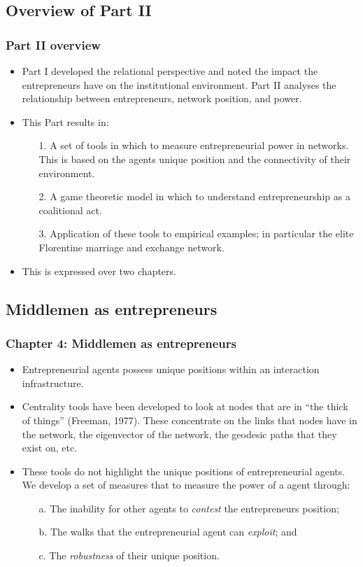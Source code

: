 \documentclass[10pt]{beamer}
\begin{document}
\subsection{Overview of Part II}

\begin{frame} \frametitle{Part II overview}
\begin{itemize}
\item Part I developed the relational perspective and noted the impact the entrepreneurs have on the institutional environment. Part II analyses the relationship between entrepreneurs, network position, and power.
\medskip
\item This Part results in:
\begin{itemize}
\medskip
\item[1.] A set of tools in which to measure entrepreneurial power in networks. This is based on the agents unique position and the connectivity of their environment.
\medskip
\item[2.] A game theoretic model in which to understand entrepreneurship as a coalitional act.
\medskip
\item[3.] Application of these tools to empirical examples; in particular the elite Florentine marriage and exchange network.
\end{itemize}
\medskip
\item This is expressed over two chapters.
\end{itemize}
\end{frame}

\subsection{Middlemen as entrepreneurs}

\begin{frame} \frametitle{Chapter 4: Middlemen as entrepreneurs}
\begin{itemize}
\item Entrepreneurial agents possess unique positions within an interaction infrastructure.
\medskip
\item Centrality tools have been developed to look at nodes that are in ``the thick of things'' (Freeman, 1977). These concentrate on the links that nodes have in the network, the eigenvector of the network, the geodesic paths that they exist on, etc.
\medskip
\item These tools do not highlight the unique positions of entrepreneurial agents. We develop a set of measures that to measure the power of a agent through:
\begin{itemize}
\medskip
\item[a.] The inability for other agents to \emph{contest} the entrepreneurs position;
\medskip
\item[b.] The walks that the entrepreneurial agent can \emph{exploit}; and
\medskip
\item[c.] The \emph{robustness} of their unique position.
\end{itemize}
\end{itemize}
\end{frame}
\end{document}
